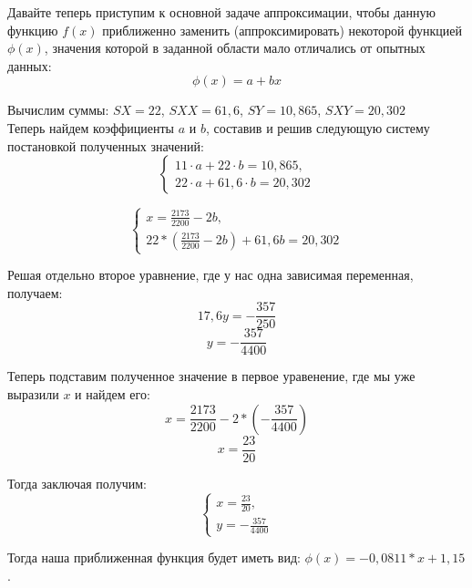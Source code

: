 \documentclass[12pt]{article}
\begin{document}
Давайте теперь приступим к основной задаче аппроксимации, чтобы данную функцию $f(x)$ приближенно заменить (аппроксимировать) некоторой функцией $\phi(x)$, значения которой в заданной области мало отличались от опытных данных:
\[ \phi(x) = a + bx \]

Вычислим суммы: $SX = 22$, $SXX = 61,6$, $SY = 10,865$, $SXY = 20,302$\\

Теперь найдем коэффициенты $a$ и $b$, составив и решив следующую систему постановкой полученных значений:
\begin{equation}
  \begin{cases}
    11 \cdot a + 22 \cdot b = 10,865,\\
    22 \cdot a + 61,6 \cdot b = 20,302
  \end{cases}
\end{equation}

\begin{equation}
  \begin{cases}
    x = \frac{2173}{2200} - 2b,\\
    22 * \left( \frac{2173}{2200} - 2b \right) + 61,6b = 20,302
  \end{cases}
\end{equation}

Решая отдельно второе уравнение, где у нас одна зависимая переменная, получаем:
$$ 17,6y = -\frac{357}{250} $$
$$ y = -\frac{357}{4400} $$

Теперь подставим полученное значение в первое уравенение, где мы уже выразили $x$ и найдем его:
$$ x = \frac{2173}{2200} - 2 * \left( -\frac{357}{4400} \right) $$
$$ x = \frac{23}{20} $$

Тогда заключая получим:\\

\begin{equation}
  \begin{cases}
    x = \frac{23}{20},\\
    y = -\frac{357}{4400}
  \end{cases}
\end{equation}

Тогда наша приближенная функция будет иметь вид: $\phi(x) = -0,0811 * x + 1,15$.\\
\end{document}
